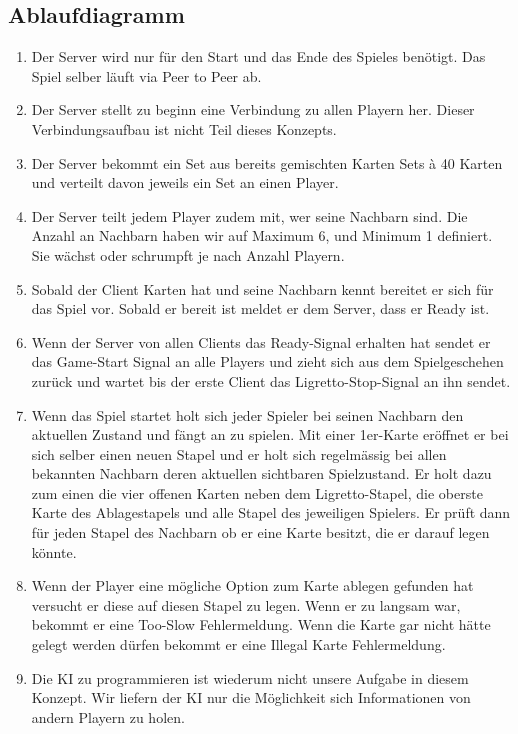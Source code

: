 \subsection{Ablaufdiagramm}

\begin{enumerate}
	\item Der Server wird nur für den Start und das Ende des Spieles benötigt. Das Spiel selber läuft via Peer to Peer ab.
	\item Der Server stellt zu beginn eine Verbindung zu allen Playern her. Dieser Verbindungsaufbau ist nicht Teil dieses Konzepts.
	\item Der Server bekommt ein Set aus bereits gemischten Karten Sets à 40 Karten und verteilt davon jeweils ein Set an einen Player.
	\item Der Server teilt jedem Player zudem mit, wer seine Nachbarn sind. Die Anzahl an Nachbarn haben wir auf Maximum 6, und Minimum 1 definiert. Sie wächst oder schrumpft je nach Anzahl Playern.
	\item Sobald der Client Karten hat und seine Nachbarn kennt bereitet er sich für das Spiel vor. Sobald er bereit ist meldet er dem Server, dass er Ready ist.
	\item Wenn der Server von allen Clients das Ready-Signal erhalten hat sendet er das Game-Start Signal an alle Players und zieht sich aus dem Spielgeschehen zurück und wartet bis der erste Client das Ligretto-Stop-Signal an ihn sendet.
	\item Wenn das Spiel startet holt sich jeder Spieler bei seinen Nachbarn den aktuellen Zustand und fängt an zu spielen. Mit einer 1er-Karte eröffnet er bei sich selber einen neuen Stapel und er holt sich regelmässig bei allen bekannten Nachbarn deren aktuellen sichtbaren Spielzustand. Er holt dazu zum einen die vier offenen Karten neben dem Ligretto-Stapel, die oberste Karte des Ablagestapels und alle Stapel des jeweiligen Spielers. Er prüft dann für jeden Stapel des Nachbarn ob er eine Karte besitzt, die er darauf legen könnte.
	\item Wenn der Player eine mögliche Option zum Karte ablegen gefunden hat versucht er diese auf diesen Stapel zu legen. Wenn er zu langsam war, bekommt er eine Too-Slow Fehlermeldung. Wenn die Karte gar nicht hätte gelegt werden dürfen bekommt er eine Illegal Karte Fehlermeldung.
	\item Die KI zu programmieren ist wiederum nicht unsere Aufgabe in diesem Konzept. Wir liefern der KI nur die Möglichkeit sich Informationen von andern Playern zu holen.

\end{enumerate}
